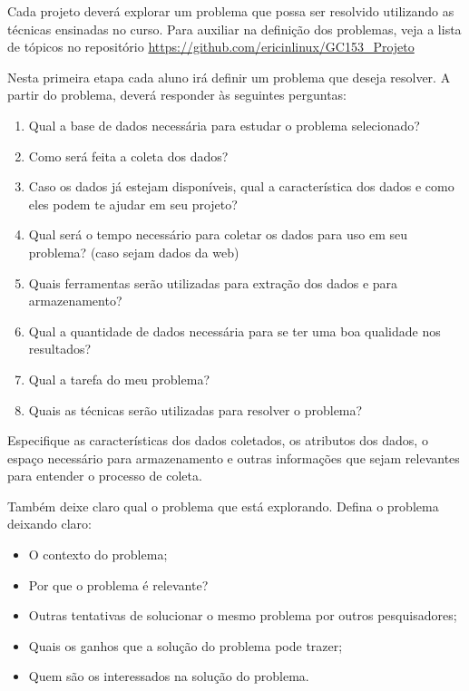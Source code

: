 \documentclass[a4 paper]{article}
\begin{document}

Cada projeto deverá explorar um problema que possa ser resolvido utilizando as técnicas ensinadas no curso. Para auxiliar na definição dos problemas, veja a lista de tópicos no repositório \url{https://github.com/ericinlinux/GC153_Projeto}

Nesta primeira etapa cada aluno irá definir um problema que deseja resolver. A partir do problema, deverá responder às seguintes perguntas:

\begin{enumerate}
    \item Qual a base de dados necessária para estudar o problema selecionado?
    \item Como será feita a coleta dos dados?
    \item Caso os dados já estejam disponíveis, qual a característica dos dados e como eles podem te ajudar em seu projeto?
    \item Qual será o tempo necessário para coletar os dados para uso em seu problema? (caso sejam dados da web)
    \item Quais ferramentas serão utilizadas para extração dos dados e para armazenamento?
    \item Qual a quantidade de dados necessária para se ter uma boa qualidade nos resultados?
    \item Qual a tarefa do meu problema?
    \item Quais as técnicas serão utilizadas para resolver o problema?
\end{enumerate}

Especifique as características dos dados coletados, os atributos dos dados, o espaço necessário para armazenamento e outras informações que sejam relevantes para entender o processo de coleta.

Também deixe claro qual o problema que está explorando. Defina o problema deixando claro:

\begin{itemize}
    \item O contexto do problema;
    \item Por que o problema é relevante?
    \item Outras tentativas de solucionar o mesmo problema por outros pesquisadores;
    \item Quais os ganhos que a solução do problema pode trazer;
    \item Quem são os interessados na solução do problema.
\end{itemize}
\end{document}
